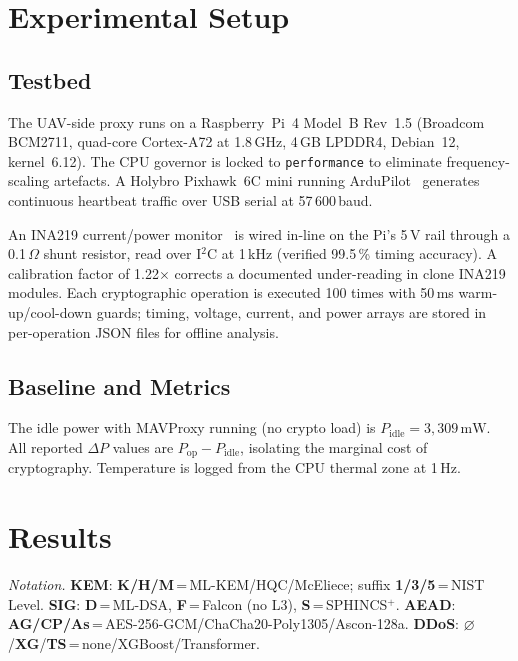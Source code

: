 \documentclass[conference]{IEEEtran}
\newcommand{\mW}{\,\si{\milli\watt}}
\begin{document}
\section{Experimental Setup}
\label{sec:eval}

\subsection{Testbed}

The UAV-side proxy runs on a Raspberry~Pi~4 Model~B Rev~1.5
(Broadcom BCM2711, quad-core Cortex-A72 at 1.8\,GHz, 4\,GB
LPDDR4, Debian~12, kernel~6.12).  The CPU governor is locked to
\texttt{performance} to eliminate frequency-scaling artefacts.  A
Holybro Pixhawk~6C mini running ArduPilot~\cite{ardupilot} generates
continuous heartbeat traffic over USB serial at 57\,600\,baud.

An INA219 current/power monitor~\cite{ina219} is wired in-line on
the Pi's 5\,V rail through a 0.1\,$\Omega$ shunt resistor, read
over I$^2$C at 1\,kHz (verified 99.5\,\% timing accuracy).  A
calibration factor of 1.22$\times$ corrects a documented
under-reading in clone INA219 modules.  Each cryptographic operation
is executed 100 times with 50\,ms warm-up/cool-down guards; timing,
voltage, current, and power arrays are stored in per-operation JSON
files for offline analysis.

\subsection{Baseline and Metrics}

The idle power with MAVProxy running (no crypto load) is
$P_\text{idle} = 3{,}309\mW$.  All reported $\Delta P$ values are
$P_\text{op} - P_\text{idle}$, isolating the marginal cost of
cryptography.  Temperature is logged from the CPU thermal zone at
1\,Hz.

\section{Results}
\label{sec:results}

\noindent\textit{Notation.}
\textbf{KEM}: \textbf{K/H/M}\,=\,ML-KEM\slash HQC\slash McEliece; suffix \textbf{1/3/5}\,=\,NIST Level.
\textbf{SIG}: \textbf{D}\,=\,ML-DSA, \textbf{F}\,=\,Falcon (no L3), \textbf{S}\,=\,SPHINCS$^+$.
\textbf{AEAD}: \textbf{AG\slash CP\slash As}\,=\,AES-256-GCM\slash ChaCha20-Poly1305\slash Ascon-128a.
\textbf{DDoS}: $\varnothing$\slash\textbf{XG}\slash\textbf{TS}\,=\,none\slash XGBoost\slash Transformer.
\end{document}

